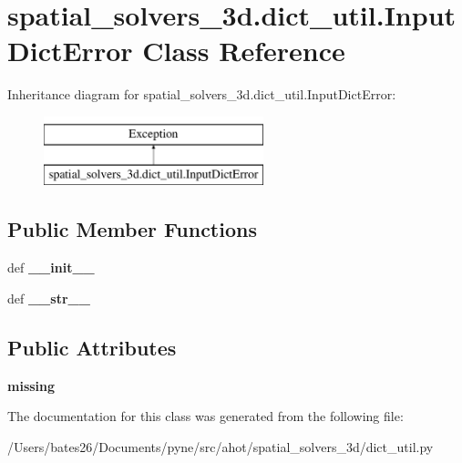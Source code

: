 \hypertarget{classspatial__solvers__3d_1_1dict__util_1_1_input_dict_error}{\section{spatial\+\_\+solvers\+\_\+3d.\+dict\+\_\+util.\+Input\+Dict\+Error Class Reference}
\label{classspatial__solvers__3d_1_1dict__util_1_1_input_dict_error}
}
Inheritance diagram for spatial\+\_\+solvers\+\_\+3d.\+dict\+\_\+util.\+Input\+Dict\+Error\+:\begin{figure}[H]
\begin{center}
\leavevmode
\includegraphics[height=2.000000cm]{classspatial__solvers__3d_1_1dict__util_1_1_input_dict_error}
\end{center}
\end{figure}
\subsection*{Public Member Functions}
\begin{DoxyCompactItemize}
\item 
\hypertarget{classspatial__solvers__3d_1_1dict__util_1_1_input_dict_error_a4966aa45d3b7fcb3d79a43b3d953d045}{def {\bfseries \+\_\+\+\_\+init\+\_\+\+\_\+}}\label{classspatial__solvers__3d_1_1dict__util_1_1_input_dict_error_a4966aa45d3b7fcb3d79a43b3d953d045}

\item 
\hypertarget{classspatial__solvers__3d_1_1dict__util_1_1_input_dict_error_af8d1148093139cb9f5ee4b154d3c0835}{def {\bfseries \+\_\+\+\_\+str\+\_\+\+\_\+}}\label{classspatial__solvers__3d_1_1dict__util_1_1_input_dict_error_af8d1148093139cb9f5ee4b154d3c0835}

\end{DoxyCompactItemize}
\subsection*{Public Attributes}
\begin{DoxyCompactItemize}
\item 
\hypertarget{classspatial__solvers__3d_1_1dict__util_1_1_input_dict_error_ac3622f01f73069150dcad765d8f9bd81}{{\bfseries missing}}\label{classspatial__solvers__3d_1_1dict__util_1_1_input_dict_error_ac3622f01f73069150dcad765d8f9bd81}

\end{DoxyCompactItemize}


The documentation for this class was generated from the following file\+:\begin{DoxyCompactItemize}
\item 
/\+Users/bates26/\+Documents/pyne/src/ahot/spatial\+\_\+solvers\+\_\+3d/dict\+\_\+util.\+py\end{DoxyCompactItemize}
